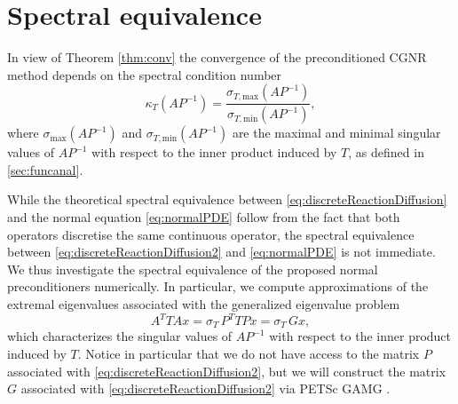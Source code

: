 \documentclass[hidelinks,onefignum,onetabnum]{siamart220329}
\begin{document}
\appendix
\section{Spectral equivalence}
\label{apx:spectral_equivalence}
In view of Theorem \ref{thm:conv} the convergence of the preconditioned CGNR method depends on the spectral condition number
\begin{equation}
    \kappa_T (AP^{-1}) = \frac{\sigma_{T,\textrm{max}}(AP^{-1})}{\sigma_{T,\textrm{min}}(AP^{-1})},
\end{equation}
where $\sigma_{\textrm{max}}(AP^{-1})$ and $\sigma_{T,\textrm{min}}(AP^{-1})$ are the maximal and minimal singular values of $AP^{-1}$ with respect to the inner product induced by $T$, as defined in \cref{sec:funcanal}.

While the theoretical spectral equivalence between \eqref{eq:discreteReactionDiffusion} and the normal  equation \eqref{eq:normalPDE} follow from the fact that both operators discretise the same continuous operator, the spectral equivalence between \eqref{eq:discreteReactionDiffusion2} and \eqref{eq:normalPDE} is not immediate.
We thus investigate the spectral equivalence of the proposed normal preconditioners numerically.
In particular, we compute approximations of the extremal eigenvalues associated with the generalized eigenvalue problem
\begin{equation}
    \label{eq:gen_eigenvalue_problem}
    A^{T} T A x = \sigma_T\, P^{T} T P x = \sigma_T\, G x,
\end{equation}
which characterizes the singular values of $AP^{-1}$ with respect to the inner product induced by $T$.
Notice in particular that we do not have access to the matrix $P$ associated with \eqref{eq:discreteReactionDiffusion2}, but we will construct the matrix $G$ associated with \eqref{eq:discreteReactionDiffusion2} via PETSc GAMG \cite{Adams}.
\end{document}
